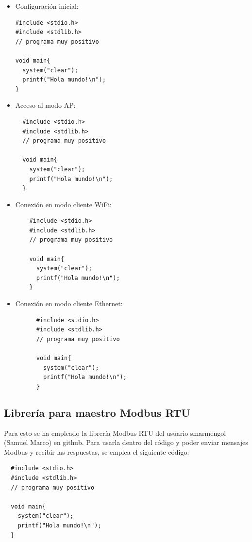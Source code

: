 \begin{itemize}
  \item Configuración inicial:

\begin{lstlisting}
#include <stdio.h>
#include <stdlib.h>
// programa muy positivo

void main{
  system("clear");
  printf("Hola mundo!\n");
}
\end{lstlisting}

\item Acceso al modo AP:

\begin{lstlisting}
  #include <stdio.h>
  #include <stdlib.h>
  // programa muy positivo
  
  void main{
    system("clear");
    printf("Hola mundo!\n");
  }
  \end{lstlisting}
  
  \item Conexión en modo cliente WiFi:
  
  \begin{lstlisting}
    #include <stdio.h>
    #include <stdlib.h>
    // programa muy positivo
    
    void main{
      system("clear");
      printf("Hola mundo!\n");
    }
    \end{lstlisting}
    
    \item Conexión en modo cliente Ethernet:
  
    \begin{lstlisting}
      #include <stdio.h>
      #include <stdlib.h>
      // programa muy positivo
      
      void main{
        system("clear");
        printf("Hola mundo!\n");
      }
      \end{lstlisting}  

\end{itemize}

\subsection{Librería para maestro Modbus RTU}
\label{subsec:maestroRTUkiwi}

Para esto se ha empleado la librería Modbus RTU del usuario smarmengol (Samuel Marco) en github. Para usarla dentro del código y poder enviar mensajes Modbus y recibir las respuestas, se emplea el siguiente código:

\begin{lstlisting}
  #include <stdio.h>
  #include <stdlib.h>
  // programa muy positivo
  
  void main{
    system("clear");
    printf("Hola mundo!\n");
  }
\end{lstlisting}

